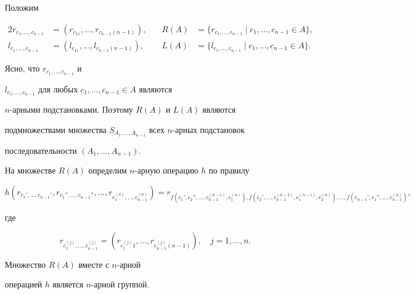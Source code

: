 Положим


\begin{alignat*}{2}


r_{c_1,\dotsc,c_{n-1}}&=(r_{c_11},\dotsc,r_{c_{n-1}(n-1)}),&\quad


R(A)&=\{r_{c_1,\dotsc,c_{n-1}}\mid c_1,\dotsc,c_{n-1}\in A\}, \\


%


l_{c_1,\dotsc,c_{n-1}}&=(l_{c_11},\dotsc,l_{c_{n-1}(n-1)}),&\quad


L(A)&=\{l_{c_1,\dotsc,c_{n-1}}\mid c_1,\dotsc,c_{n-1}\in A\}.


\end{alignat*}





Ясно, что $r_{c_1,\dotsc,c_{n-1}}$  и


$l_{c_1,\dotsc,c_{n-1}}$ для любых $c_1,\dotsc,c_{n-1}\in A$ являются


$n$-арными подстановками. Поэтому $R(A)$ и $L(A)$ являются


подмножествами множества $S_{A_1,\dotsc, A_{n-1}}$ всех $n$-арных подстановок


последовательности $(A_1,\dotsc, A_{n-1})$.





На множестве $R(A)$ определим $n$-арную операцию $h$ по правилу


$$


h(r_{c_1',\dotsc,c_{n-1}'},r_{c_1'',\dotsc,c_{n-1}''},\dotsc,r_{c_1^{(n)}


,\dotsc,c_{n-1}^{(n)}})=


r_{f(c_1',c_2'',\dotsc,c_{n-1}^{(n-1)},c_1^{(n)}),


f(c_2',\dotsc,c_{n-1}^{(n-2)},c_1^{(n-1)},c_2^{(n)}),\dotsc,


f(c_{n-1}',c_1'',\dotsc,c_{n-1}^{(n)})},


$$


где


$$


r_{c_1^{(j)},\dotsc,c_{n-1}^{(j)}}=


(r_{c_1^{(j)}1},\dotsc,r_{c_{n-1}^{(j)}(n-1)}),\quad


j = 1,\dotsc, n.


$$





\begin{prop}


Множество $R(A)$ вместе с $n$-арной


операцией $h$ является $n$-арной группой.


\end{prop}





